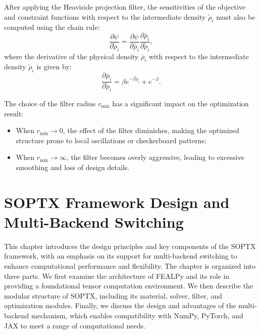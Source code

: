 \documentclass[mathpazo]{cicp}
\begin{document}
After applying the Heaviside projection filter, the sensitivities of the objective and constraint functions with respect to the intermediate density $\tilde{\rho}_i$ must also be computed using the chain rule: 
\begin{equation*}
	\frac{\partial\psi}{\partial\tilde\rho_i} = \frac{\partial\psi}{\partial\bar\rho_i} \frac{\partial\bar\rho_i}{\partial\tilde\rho_i},
\end{equation*} 
where the derivative of the physical density $\bar{\rho}_i$ with respect to the intermediate density $\tilde{\rho}_i$ is given by:
\begin{equation*}
	\frac{\partial\bar\rho_i}{\partial\tilde\rho_i} = \beta{e}^{-\beta\tilde\rho_i} + e^{-\beta}.
\end{equation*}

The choice of the filter radius $r_{\min}$ has a significant impact on the optimization result: 
\begin{itemize} 
	\item When $r_{\min} \to 0$, the effect of the filter diminishes, making the optimized structure prone to local oscillations or checkerboard patterns; 
	\item When $r_{\min} \to \infty$, the filter becomes overly aggressive, leading to excessive smoothing and loss of design details. 
\end{itemize}

\section{SOPTX Framework Design and Multi-Backend Switching}
This chapter introduces the design principles and key components of the SOPTX framework, with an emphasis on its support for multi-backend switching to enhance computational performance and flexibility. The chapter is organized into three parts. We first examine the architecture of FEALPy and its role in providing a foundational tensor computation environment. We then describe the modular structure of SOPTX, including its material, solver, filter, and optimization modules. Finally, we discuss the design and advantages of the multi-backend mechanism, which enables compatibility with NumPy, PyTorch, and JAX to meet a range of computational needs. 
\end{document}
